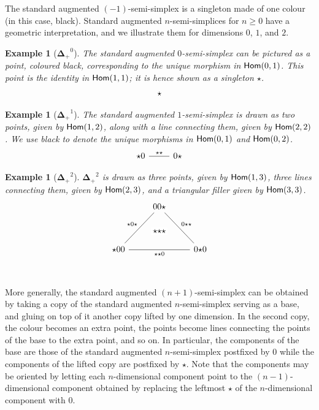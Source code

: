 \documentclass{msc}
\newcommand{\DeltaPlus}{\ensuremath{\boldsymbol{\Delta}_+}}
\newtheorem{example}[therm]{Example}
\newcommand{\kstar}{{\star}}
\begin{document}
The standard augmented $(-1)$-semi-simplex is a singleton made of one colour (in this case, black). Standard augmented $n$-semi-simplices for $n \geq 0$ have a geometric interpretation, and we illustrate them for dimensions $0$, $1$, and $2$.

\begin{example}[$\DeltaPlus^0$]
  The standard augmented $0$-semi-simplex can be pictured as a point, coloured black, corresponding to the unique morphism in $\mathsf{Hom}(0, 1)$. This point is the identity in $\mathsf{Hom}(1, 1)$; it is hence shown as a singleton $\kstar$.
  \begin{equation*}
    \begin{tikzcd}
      \kstar
    \end{tikzcd}
  \end{equation*}
\end{example}

\begin{example}[$\DeltaPlus^1$]
  The standard augmented $1$-semi-simplex is drawn as two points, given by $\mathsf{Hom}(1, 2)$, along with a line connecting them, given by $\mathsf{Hom}(2, 2)$. We use black to denote the unique morphisms in $\mathsf{Hom}(0, 1)$ and $\mathsf{Hom}(0, 2)$.
  \begin{equation*}
    \begin{tikzcd}
      \kstar0 \arrow[r, dash, "\kstar\kstar"] & 0\kstar
    \end{tikzcd}
  \end{equation*}
\end{example}

\begin{example}[$\DeltaPlus^2$]
  $\DeltaPlus^2$ is drawn as three points, given by $\mathsf{Hom}(1, 3)$, three lines connecting them, given by $\mathsf{Hom}(2, 3)$, and a triangular filler given by $\mathsf{Hom}(3, 3)$.
  \begin{equation*}
    \begin{tikzcd}
      & |[alias=F]|00\kstar \arrow[ddr, dash, "0\kstar\kstar"] & \\\\
      \kstar00 \arrow[rr, dash, "\kstar\kstar0"{name=T, below}]\arrow[uur, dash, "\kstar0\kstar"] && 0\kstar0 \\
      \arrow[rightarrow, from=F, to=T, phantom, "\kstar\kstar\kstar" description]
    \end{tikzcd}
  \end{equation*}
\end{example}

More generally, the standard augmented $(n + 1)$-semi-simplex can be obtained by taking a copy of the standard augmented $n$-semi-simplex serving as a base, and gluing on top of it another copy lifted by one dimension. In the second copy, the colour becomes an extra point, the points become lines connecting the points of the base to the extra point, and so on. In particular, the components of the base are those of the standard augmented $n$-semi-simplex postfixed by $0$ while the components of the lifted copy are postfixed by $\kstar$. Note that the components may be oriented by letting each $n$-dimensional component point to the $(n-1)$-dimensional component obtained by replacing the leftmost $\kstar$ of the $n$-dimensional component with $0$.
\end{document}
